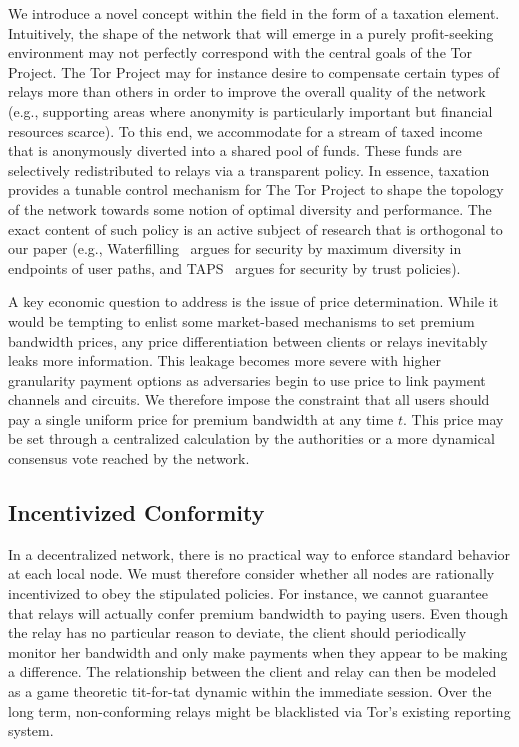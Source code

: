 We introduce a novel concept within the field in the form of a taxation element.
Intuitively, the shape of the network that will emerge in a purely
profit-seeking environment may not perfectly correspond with the central goals
of the Tor Project. The Tor Project may for instance desire to compensate
certain types of relays more than others in order to improve the overall quality
of the network (e.g., supporting areas where anonymity is particularly important
but financial resources scarce). To this end, we accommodate for a stream of
taxed income that is anonymously diverted into a shared pool of funds. These
funds are selectively redistributed to relays via a transparent policy. In
essence, taxation provides a tunable control mechanism for The Tor Project to
shape the topology of the network towards some notion of optimal diversity and
performance. The exact content of such policy is an active subject of research
that is orthogonal to our paper (e.g., Waterfilling~\cite{waterfilling-pets2017}
argues for security by maximum diversity in endpoints of user paths, and
TAPS~\cite{taps-ndss2017} argues for security by trust policies).

A key economic question to address is the issue of price determination. While it
would be tempting to enlist some market-based mechanisms to set premium
bandwidth prices, any price differentiation between clients or relays inevitably
leaks more information. This leakage becomes more severe with higher granularity
payment options as adversaries begin to use price to link payment channels and
circuits. We therefore impose the constraint that all users should pay a single
uniform price for premium bandwidth at any time $t$. This price may be set
through a centralized calculation by the authorities or a more dynamical
consensus vote reached by the network.
\subsection{Incentivized Conformity} In a decentralized network, there is no
practical way to enforce standard behavior at each local node. We must therefore
consider whether all nodes are rationally incentivized to obey the stipulated
policies. For instance, we cannot guarantee that relays will actually confer
premium bandwidth to paying users. Even though the relay has no particular
reason to deviate, the client should periodically monitor her bandwidth and only
make payments when they appear to be making a difference. The relationship
between the client and relay can then be modeled as a game theoretic tit-for-tat
dynamic within the immediate session. Over the long term, non-conforming relays
might be blacklisted via Tor's existing reporting system.

